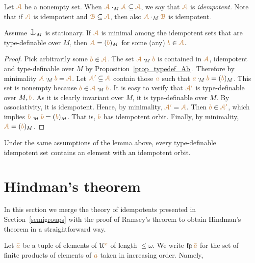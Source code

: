 Let ${\color{brown}\EuScript A}$ be a nonempty set.
When ${\color{brown}\EuScript A}\cdot_M{\color{brown}\EuScript A}\subseteq{\color{brown}\EuScript A}$, we say that ${\color{brown}\EuScript A}$ is \emph{idempotent.}
Note that if  ${\color{brown}\EuScript A}$ is idempotent and ${\color{brown}\EuScript B}\subseteq{\color{brown}\EuScript A}$, then also ${\color{brown}\EuScript A}\cdot_M{\color{brown}\EuScript B}$ is idempotent.

\begin{lemma}\label{lem_Hindman}
Assume $\cnonfork_M$ is stationary.
If ${\color{brown}\EuScript A}$ is minimal among the
idempotent sets that are
type-definable over $M$, then ${\color{brown}\EuScript A}=({\color{brown} b})_M$ for some (any) ${\color{brown} b}\in{\color{brown}\EuScript A}$.
\end{lemma}

\begin{proof}
Pick arbitrarily some ${\color{brown} b}\in{\color{brown}\EuScript A}$.
%
The set ${\color{brown}\EuScript A}\cdot_{\!M}{\color{brown} b}$ is contained in ${\color{brown}\EuScript A}$, idempotent and 
type-definable over $M$ by Proposition~\ref{prop_typedef_Ab}.
%
Therefore by minimality ${\color{brown}\EuScript A}\cdot_{\!M}{\color{brown} b}={\color{brown}\EuScript A}$.
%
Let ${\color{brown}\EuScript A'}\subseteq{\color{brown}\EuScript A}$ contain those ${\color{brown} a}$ such that 
${\color{brown} a}\cdot_{\!M}{\color{brown} b}=({\color{brown} b})_M$.
%
This set is nonempty because ${\color{brown} b}\in{\color{brown}\EuScript A}\cdot_{\!M}{\color{brown} b}$.
%
It is easy to verify that ${\color{brown}\EuScript A'}$ is type-definable over $M,{\color{brown} b}$.
%
As it is clearly invariant over $M$, it is type-definable over $M$.
%
By associativity, it is idempotent.
%
Hence, by minimality, ${\color{brown}\EuScript A'}={\color{brown}\EuScript A}$.
%
Then ${\color{brown} b}\in{\color{brown}\EuScript A'}$, which implies ${\color{brown} b}\cdot_{\!M}{\color{brown} b}=({\color{brown} b})_M$.
%
That is, ${\color{brown} b}$ has idempotent orbit.
%
Finally, by minimality, ${\color{brown}\EuScript A}=({\color{brown} b})_M$.
\end{proof}

\begin{corollary}\label{corol_idempotent}
Under the same assumptions of the lemma above, every type-definable 
idempotent set contains an element with an idempotent orbit.
\end{corollary}

\section{Hindman's theorem}\label{Hindman}

In this section we merge the theory of idempotents presented in Section~\ref{semigroups}
with the proof of Ramsey's theorem to obtain Hindman's theorem in a straightforward way.

Let ${\color{brown}\bar a}$ be a tuple of elements of $\EuScript U^{\color{brown} x}$ of length $\le\omega$.
We write ${\rm fp}\,{\color{brown}\bar a}$ for the set of finite products of elements 
of ${\color{brown}\bar a}$ taken in increasing order. 
Namely, 

